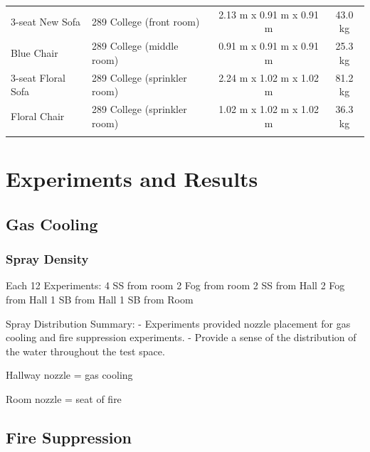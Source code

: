 \documentclass[12pt,oneside]{book}
\begin{document}
\begin{table}
\begin{tabular}{llcc}
		3-seat New Sofa              &  289 College (front room)         &  2.13 m x 0.91 m x 0.91 m  &  43.0 kg    \\
		Blue Chair                   &  289 College (middle room)        &  0.91 m x 0.91 m x 0.91 m  &  25.3 kg    \\
		3-seat Floral Sofa           &  289 College (sprinkler room)     &  2.24 m x 1.02 m x 1.02 m  &  81.2 kg    \\
		Floral Chair                 &  289 College (sprinkler room)     &  1.02 m x 1.02 m x 1.02 m  &  36.3 kg    \\
		\noalign{\smallskip}\hline
	\end{tabular}
	\label{tab:Fuel_Masses}
\end{table}

\chapter{Experiments and Results}
\label{chap:Experiments_and_Results}

\section{Gas Cooling}
\label{sec:Gas_Cooling}

\subsection{Spray Density}
\label{subsec:Spray_Density}

Each 
12 Experiments:
4 SS from room
2 Fog from room
2 SS from Hall
2 Fog from Hall
1 SB from Hall
1 SB from Room

Spray Distribution Summary:
- Experiments provided nozzle placement for gas cooling and fire suppression experiments.
- Provide a sense of the distribution of the water throughout the test space.

Hallway nozzle = gas cooling

Room nozzle = seat of fire

\section{Fire Suppression}
\label{sec:Fire_Suppression}	
\end{document}
